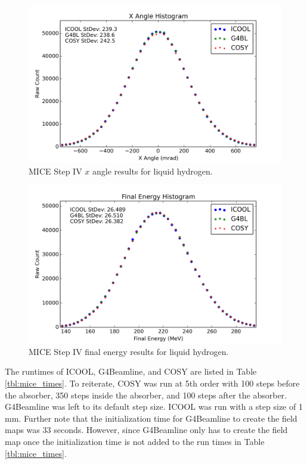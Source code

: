 \begin{figure}[H]
  \centering
    \includegraphics[width=\textwidth]{MICE data/px} 
  \caption{MICE Step IV $x$ angle results for liquid hydrogen.}
  \label{fig:micexangle}
\end{figure}

\begin{figure}[H]
  \centering
    \includegraphics[width=\textwidth]{MICE data/e} 
  \caption{MICE Step IV final energy results for liquid hydrogen.}
  \label{fig:miceenergy}
\end{figure}

The runtimes of ICOOL, G4Beamline, and COSY are listed in Table \ref{tbl:mice_times}. To reiterate, COSY was run at 5th order with 100 steps before the absorber, 350 steps inside the absorber, and 100 steps after the absorber. G4Beamline was left to its default step size. ICOOL was run with a step size of 1 mm. Further note that the initialization time for G4Beamline to create the field maps was 33 seconds. However, since G4Beamline only has to create the field map once the initialization time is not added to the run times in Table \ref{tbl:mice_times}.

